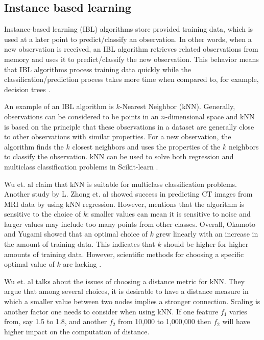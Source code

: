 	\subsection{Instance based learning} \label{sec:knn}
	Instance-based learning (IBL) algorithms store provided training data, which is used at a later point to predict/classify an observation. In other words, when a new observation is received, an IBL algorithm retrieves related observations from memory and uses it to predict/classify the new observation. This behavior means that IBL algorithms process training data quickly while the classification/prediction process takes more time when compared to, for example, decision trees \cite{ARTICLE:8}. 

	An example of an IBL algorithm is $k$-Nearest Neighbor (kNN). Generally, observations can be considered to be points in an $n$-dimensional space and kNN is based on the principle that these observations in a dataset are generally close to other observations with similar properties.  For a new observation, the algorithm finds the $k$ closest neighbors and uses the properties of the $k$ neighbors to classify the observation. kNN can be used to solve both regression and multiclass classification problems in Scikit-learn \cite{WEBSITE:17, WEBSITE:18}.

	Wu et. al \cite{ARTICLE:9} claim that kNN is suitable for multiclass classification problems. Another study by L. Zhong et. al \cite{IP:3} showed success in predicting CT images from MRI data by using kNN regression. However, \cite{ARTICLE:9} mentions that the algorithm is sensitive to the choice of $k$: smaller values can mean it is sensitive to noise and larger values may include too many points from other classes. Overall, Okamoto and Yugami \cite{ARTICLE:12} showed that an optimal choice of $k$ grew linearly with an increase in the amount of training data. This indicates that $k$ should be higher for higher amounts of training data. However, scientific methods for choosing a specific optimal value of $k$ are lacking \cite{ARTICLE:7}.

	Wu et. al \cite{ARTICLE:9} talks about the issues of choosing a distance metric for kNN. They argue that among several choices, it is desirable to have a distance measure in which a smaller value between two nodes implies a stronger connection. Scaling is another factor one needs to consider when using kNN. If one feature $f_1$ varies from, say 1.5 to 1.8, and another $f_2$ from 10,000 to 1,000,000 then $f_2$ will have higher impact on the computation of distance. 
	
